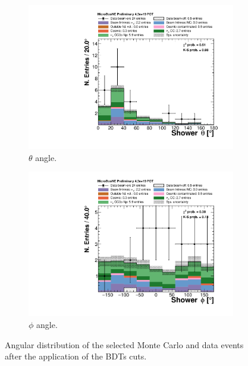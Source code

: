 \begin{figure}
\centering
  \begin{subfigure}{0.48\textwidth}
    \includegraphics[width=\linewidth]{figures/theta_bdt.pdf}
    \caption{$\theta$ angle.} 
  \end{subfigure}
    \begin{subfigure}{0.48\textwidth}
    \includegraphics[width=\linewidth]{figures/phi_bdt.pdf}
    \caption{$\phi$ angle.} 
  \end{subfigure}
  \caption{Angular distribution of the selected Monte Carlo and data events after the application of the BDTs cuts.}
  \label{fig:angle_bdt}
\end{figure}